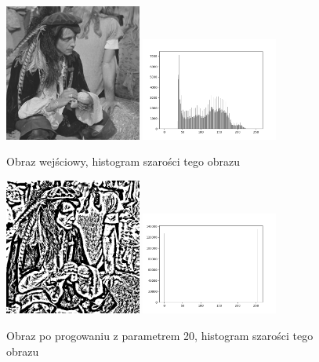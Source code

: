 \documentclass[final,a4paper,openany,12pt]{mwbk}
\begin{document}
\begin{figure}[H]
	\begin{center}
		\includegraphics[width=0.4\textwidth]{pirate_gray}
		\includegraphics[width=0.4\textwidth]{pirate_gray_histogram}
	\end{center}
	\caption{Obraz wejściowy, histogram szarości tego obrazu}
\end{figure}

\begin{figure}[H]
	\begin{center}
		\includegraphics[width=0.4\textwidth]{pirate_gray_locThreshold_result}
		\includegraphics[width=0.4\textwidth]{pirate_gray_locThreshold_histogram}
	\end{center}
	\caption{Obraz po progowaniu z parametrem 20, histogram szarości tego obrazu}
\end{figure}
\end{document}
